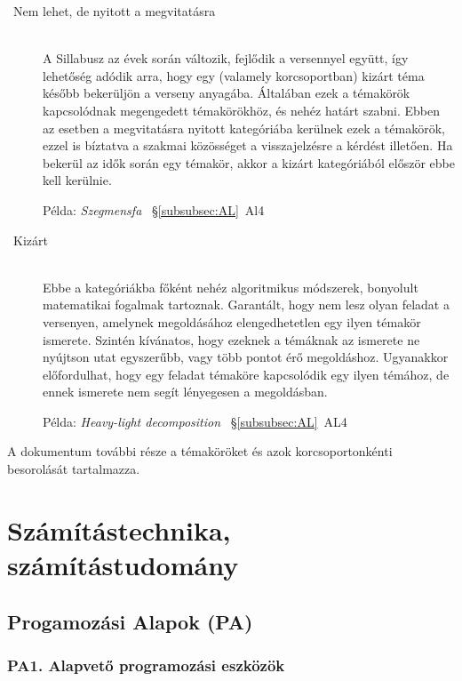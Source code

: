 \documentclass[a4paper,11pt,oneside]{article}
\newcommand{\xmark}{\ding{55}}%
\newcommand{\cemay}{{\small\xmark\faQuestionCircle}}
\newcommand{\cexcl}{{\small\xmark}}
\begin{document}
\begin{description}
\item[\cexcl\ Nem lehet, de nyitott a megvitatásra]~\\
    A Sillabusz az évek során változik, fejlődik a versennyel együtt, így lehetőség
    adódik arra, hogy egy (valamely korcsoportban) kizárt téma később bekerüljön
    a verseny anyagába. Általában ezek a témakörök kapcsolódnak megengedett témakörökhöz,
    és nehéz határt szabni. Ebben az esetben a megvitatásra nyitott kategóriába kerülnek
    ezek a témakörök, ezzel is bíztatva a szakmai közösséget a visszajelzésre a kérdést illetően.
    Ha bekerül az idők során egy témakör, akkor a kizárt kategóriából először ebbe kell kerülnie.
    
    Példa: \emph{Szegmensfa\/} ~\S\ref{subsubsec:AL}~Al4

\item[\cemay\ Kizárt]~\\
    Ebbe a kategóriákba főként nehéz algoritmikus módszerek, bonyolult matematikai fogalmak
    tartoznak. Garantált, hogy nem lesz olyan feladat a versenyen, amelynek megoldásához
    elengedhetetlen egy ilyen témakör ismerete. Szintén kívánatos, hogy ezeknek a témáknak
    az ismerete ne nyújtson utat egyszerűbb, vagy több pontot érő megoldáshoz. Ugyanakkor
    előfordulhat, hogy egy feladat témaköre kapcsolódik egy ilyen témához, de ennek ismerete
    nem segít lényegesen a megoldásban.

    Példa: \emph{Heavy-light decomposition} ~\S\ref{subsubsec:AL}~AL4

\end{description}

\bigskip

\noindent
A dokumentum további része a témaköröket és azok korcsoportonkénti besorolását tartalmazza.


\section {Számítástechnika, számítástudomány} %
\label{subsec:computing-science}

\subsection {Progamozási Alapok (PA)} %
\label{subsubsec:PF}

\subsubsection*{PA1. Alapvető programozási eszközök} %
\end{document}
